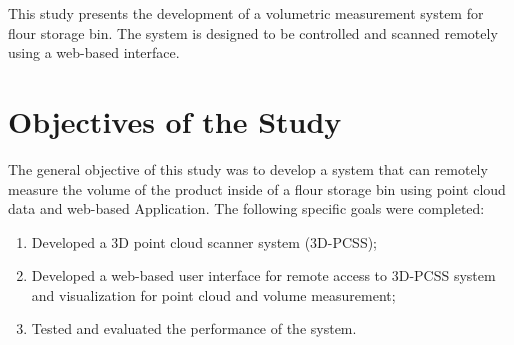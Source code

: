 

This study presents the development of a volumetric measurement system for flour storage bin. The system is designed to be controlled and scanned remotely using a web-based interface.


\section{Objectives of the Study}
\label{intro:sec:Objectives of the Study}
The general objective of this study was to develop a system that can remotely measure the volume of the product inside of a flour storage bin using point cloud data and web-based Application. The following specific goals were completed:

\begin{enumerate}
	\item Developed a 3D point cloud scanner system (3D-PCSS);
	\item Developed a web-based user interface for remote access to 3D-PCSS system and visualization for point cloud and volume measurement;
	\item Tested and evaluated the performance of the system.
\end{enumerate}

